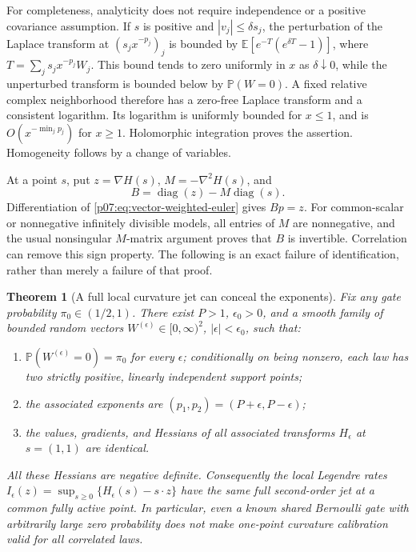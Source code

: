 \documentclass[11pt,letterpaper]{article}
\newtheorem{theorem}{Theorem}[section]
\theoremstyle{definition}
\theoremstyle{remark}
\newcommand{\1}{\mathbf 1}
\begin{document}
For completeness, analyticity does not require independence or a
positive covariance assumption.  If $s$ is positive and
$|v_j|\le\delta s_j$, the perturbation of the Laplace transform at
$(s_jx^{-p_j})_j$ is bounded by
$\mathbb E[e^{-T}(e^{\delta T}-1)]$, where
$T=\sum_j s_jx^{-p_j}W_j$.  This bound tends to zero uniformly in
$x$ as $\delta\downarrow0$, while the unperturbed transform is bounded
below by $\mathbb P(W=0)$.  A fixed relative complex neighborhood
therefore has a zero-free Laplace transform and a consistent logarithm.
Its logarithm is uniformly bounded for $x\le1$, and is
$O(x^{-\min_jp_j})$ for $x\ge1$.  Holomorphic integration proves the
assertion.  Homogeneity follows by a change of variables.

At a point $s$, put $z=\nabla H(s)$, $M=-\nabla^2H(s)$, and
\[
 B=\operatorname{diag}(z)-M\operatorname{diag}(s).
\]
Differentiation of \eqref{p07:eq:vector-weighted-euler} gives $Bp=z$.
For common-scalar or nonnegative infinitely divisible models, all
entries of $M$ are nonnegative, and the usual nonsingular $M$-matrix
argument proves that $B$ is invertible.  Correlation can remove this
sign property.  The following is an exact failure of identification,
rather than merely a failure of that proof.

\begin{theorem}[A full local curvature jet can conceal the exponents]
\label{p07:thm:correlated-jet-counterexample}
Fix any gate probability $\pi_0\in(1/2,1)$.  There exist $P>1$,
$\epsilon_0>0$, and a smooth family of bounded random vectors
$W^{(\epsilon)}\in[0,\infty)^2$, $|\epsilon|<\epsilon_0$, such that:
\begin{enumerate}
\item $\mathbb P(W^{(\epsilon)}=0)=\pi_0$ for every $\epsilon$;
conditionally on being nonzero, each law has two strictly positive,
linearly independent support points;
\item the associated exponents are
$(p_1,p_2)=(P+\epsilon,P-\epsilon)$;
\item the values, gradients, and Hessians of all associated transforms
$H_\epsilon$ at $s=(1,1)$ are identical.
\end{enumerate}
All these Hessians are negative definite.  Consequently the local
Legendre rates $I_\epsilon(z)=\sup_{s\ge0}\{H_\epsilon(s)-s\cdot z\}$
have the same full second-order jet at a common fully active point.
In particular, even a known shared Bernoulli gate with arbitrarily
large zero probability does not make one-point curvature calibration
valid for all correlated laws.
\end{theorem}
\end{document}
